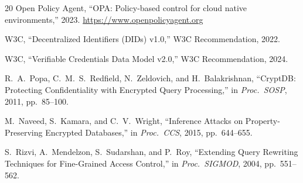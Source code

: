 \documentclass[10pt,twocolumn]{article}
\begin{document}
\begin{thebibliography}{20}
Open Policy Agent,
``OPA: Policy-based control for cloud native environments,'' 2023.
\url{https://www.openpolicyagent.org}

W3C, ``Decentralized Identifiers (DIDs) v1.0,''
W3C Recommendation, 2022.

W3C, ``Verifiable Credentials Data Model v2.0,''
W3C Recommendation, 2024.

R.~A.~Popa, C.~M.~S.~Redfield, N.~Zeldovich, and H.~Balakrishnan,
``CryptDB: Protecting Confidentiality with Encrypted Query
Processing,''
in \emph{Proc.\ SOSP}, 2011, pp.~85--100.

M.~Naveed, S.~Kamara, and C.~V.~Wright,
``Inference Attacks on Property-Preserving Encrypted Databases,''
in \emph{Proc.\ CCS}, 2015, pp.~644--655.

S.~Rizvi, A.~Mendelzon, S.~Sudarshan, and P.~Roy,
``Extending Query Rewriting Techniques for Fine-Grained Access
Control,'' in \emph{Proc.\ SIGMOD}, 2004, pp.~551--562.

\end{thebibliography}
\end{document}
